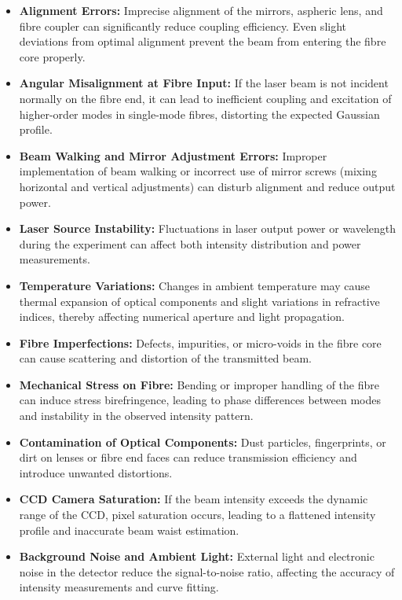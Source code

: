 \begin{itemize}

\item \textbf{Alignment Errors:}  
Imprecise alignment of the mirrors, aspheric lens, and fibre coupler can significantly reduce coupling efficiency. Even slight deviations from optimal alignment prevent the beam from entering the fibre core properly.

\item \textbf{Angular Misalignment at Fibre Input:}  
If the laser beam is not incident normally on the fibre end, it can lead to inefficient coupling and excitation of higher-order modes in single-mode fibres, distorting the expected Gaussian profile.

\item \textbf{Beam Walking and Mirror Adjustment Errors:}  
Improper implementation of beam walking or incorrect use of mirror screws (mixing horizontal and vertical adjustments) can disturb alignment and reduce output power.

\item \textbf{Laser Source Instability:}  
Fluctuations in laser output power or wavelength during the experiment can affect both intensity distribution and power measurements.

\item \textbf{Temperature Variations:}  
Changes in ambient temperature may cause thermal expansion of optical components and slight variations in refractive indices, thereby affecting numerical aperture and light propagation.

\item \textbf{Fibre Imperfections:}  
Defects, impurities, or micro-voids in the fibre core can cause scattering and distortion of the transmitted beam.

\item \textbf{Mechanical Stress on Fibre:}  
Bending or improper handling of the fibre can induce stress birefringence, leading to phase differences between modes and instability in the observed intensity pattern.

\item \textbf{Contamination of Optical Components:}  
Dust particles, fingerprints, or dirt on lenses or fibre end faces can reduce transmission efficiency and introduce unwanted distortions.

\item \textbf{CCD Camera Saturation:}  
If the beam intensity exceeds the dynamic range of the CCD, pixel saturation occurs, leading to a flattened intensity profile and inaccurate beam waist estimation.

\item \textbf{Background Noise and Ambient Light:}  
External light and electronic noise in the detector reduce the signal-to-noise ratio, affecting the accuracy of intensity measurements and curve fitting.

\end{itemize}

